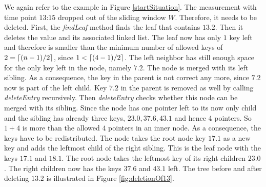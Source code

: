 \documentclass[abstracton,12pt,oneside]{scrreprt}
\DeclarePairedDelimiter\ceil{\lceil}{\rceil}
\begin{document}
\begin{exmp}
	We again refer to the example in Figure \ref{startSituation}. The measurement with time point $\text{13:15}$ dropped out of the sliding window $W$. Therefore, it needs to be deleted. First, the \emph{findLeaf} method finds the leaf that contains $13.2$. Then it deletes the value and its associated linked list. The leaf now has only $1$ key left and therefore is smaller than the minimum number of allowed keys of $2=\ceil{(n-1)/2}$, since $1<\ceil{(4-1)/2}$. The left neighbor has still enough space for the only key left in the node, namely $7.2$. The node is merged with its left sibling. As a consequence, the key in the parent is not correct any more, since $7.2$ now is part of the left child. Key $7.2$ in the parent is removed as well by calling \emph{deleteEntry} recursively. Then \emph{deleteEntry} checks whether this node can be merged with its sibling. Since the node has one pointer left to its now only child and the sibling has already three keys, $23.0,37.6, 43.1$ and hence 4 pointers. So $1+4$ is more than the allowed $4$ pointers in an inner node. As a consequence, the keys have to be redistributed. The node takes the root node key $17.1$ as a new key and adds the leftmost child of the right sibling. This is the leaf node with the keys $17.1$ and $18.1$. The root node takes the leftmost key of its right children $23.0$. The right children now has the keys $37.6$ and $43.1$ left. The tree before and after deleting $13.2$ is illustrated in Figure \ref{fig:deletionOf13}.
\end{exmp}
\end{document}
